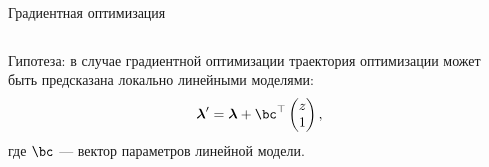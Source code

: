 \documentclass[12pt, aspectratio=169]{beamer}
\begin{document}
\begin{frame}{Градиентная оптимизация}
\begin{columns}[c]
\fontsize{12}{10}\selectfont
{\color{red}Гипотеза}: в случае градиентной оптимизации траектория оптимизации может быть предсказана локально линейными моделями:
\fontsize{12}{10}\selectfont
$$\boldsymbol{\lambda}^\prime = 
     \boldsymbol{\lambda} + \bc^{\top}\begin{pmatrix}z\\1\end{pmatrix},$$
\fontsize{12}{10}\selectfont
где $\bc$ --- вектор параметров линейной модели.
\end{columns}

\end{frame}


\end{document}
